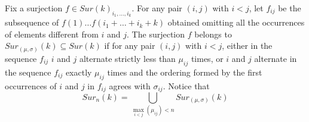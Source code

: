\begin{definition}
	Fix a surjection $f\in Sur(k)_{i_{1},\dots,i_{k}}$.
	For any pair $(i,j)$ with $i< j$, let $f_{ij}$ be the subsequence of $f(1) \dots f(i_1+\dots+i_k+k)$ obtained omitting all the occurrences of elements different from $i$ and $j$.
	The surjection $f$ belongs to $Sur_{(\mu,\sigma)}(k)\subseteq Sur(k)$ if for any pair $(i,j)$ with $i< j$, either in the sequence $f_{ij}$ $i$ and $j$ alternate strictly less than $\mu_{ij}$ times,
	or $i$ and $j$ alternate in the sequence $f_{ij}$  exactly $\mu_{ij}$ times and the ordering formed by the first occurrences of $i$ and $j$ in $f_{ij}$ agrees with $\sigma_{ij}$.
	Notice that \begin{equation*}
		\label{def}
		Sur_{n}(k)=\bigcup_{\max_{i<j}(\mu_{ij})< n} Sur_{(\mu,\sigma)}(k)
	\end{equation*}

\end{definition}

